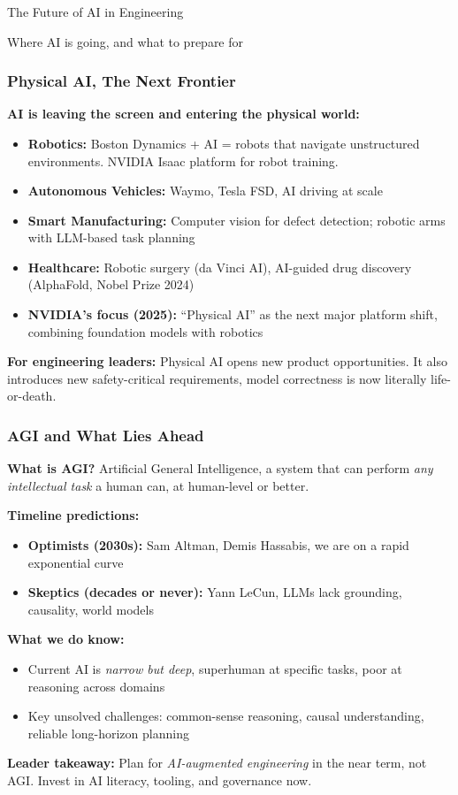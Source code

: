 \begin{frame}[fragile]\frametitle{}
\begin{center}
{\Large The Future of AI in Engineering}

{\small Where AI is going, and what to prepare for}
\end{center}
\end{frame}

\begin{frame}[fragile]\frametitle{Physical AI, The Next Frontier}
\textbf{AI is leaving the screen and entering the physical world:}
\begin{itemize}
\item \textbf{Robotics:} Boston Dynamics + AI = robots that navigate unstructured environments. NVIDIA Isaac platform for robot training.
\item \textbf{Autonomous Vehicles:} Waymo, Tesla FSD, AI driving at scale
\item \textbf{Smart Manufacturing:} Computer vision for defect detection; robotic arms with LLM-based task planning
\item \textbf{Healthcare:} Robotic surgery (da Vinci AI), AI-guided drug discovery (AlphaFold, Nobel Prize 2024)
\item \textbf{NVIDIA's focus (2025):} ``Physical AI'' as the next major platform shift, combining foundation models with robotics
\end{itemize}

\textbf{For engineering leaders:} Physical AI opens new product opportunities. It also introduces new safety-critical requirements, model correctness is now literally life-or-death.
\end{frame}

\begin{frame}[fragile]\frametitle{AGI and What Lies Ahead}
\textbf{What is AGI?} Artificial General Intelligence, a system that can perform \textit{any intellectual task} a human can, at human-level or better.

\textbf{Timeline predictions:}
\begin{itemize}
\item \textbf{Optimists (2030s):} Sam Altman, Demis Hassabis, we are on a rapid exponential curve
\item \textbf{Skeptics (decades or never):} Yann LeCun, LLMs lack grounding, causality, world models
\end{itemize}

\textbf{What we do know:}
\begin{itemize}
\item Current AI is \textit{narrow but deep}, superhuman at specific tasks, poor at reasoning across domains
\item Key unsolved challenges: common-sense reasoning, causal understanding, reliable long-horizon planning
\end{itemize}

\textbf{Leader takeaway:} Plan for \textit{AI-augmented engineering} in the near term, not AGI. Invest in AI literacy, tooling, and governance now.
\end{frame}

